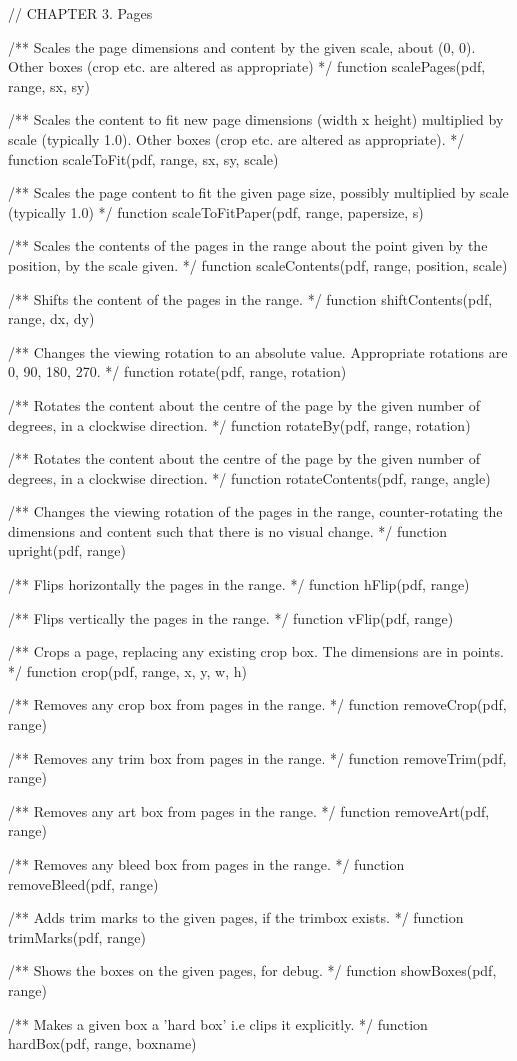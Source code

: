 // CHAPTER 3. Pages

/** Scales the page dimensions and content by the given scale, about (0, 0).
Other boxes (crop etc. are altered as appropriate) */
function scalePages(pdf, range, sx, sy)

/** Scales the content to fit new page dimensions (width x height) multiplied
by scale (typically 1.0). Other boxes (crop etc. are altered as appropriate). */
function scaleToFit(pdf, range, sx, sy, scale)

/** Scales the page content to fit the given page size, possibly multiplied by
scale (typically 1.0) */
function scaleToFitPaper(pdf, range, papersize, s)

/** Scales the contents of the pages in the range about the point given by
the position, by the scale given. */
function scaleContents(pdf, range, position, scale)

/** Shifts the content of the pages in the range. */
function shiftContents(pdf, range, dx, dy)

/** Changes the viewing rotation to an absolute value. Appropriate rotations
are 0, 90, 180, 270. */
function rotate(pdf, range, rotation)

/** Rotates the content about the centre of the page by the given number of
degrees, in a clockwise direction. */
function rotateBy(pdf, range, rotation)

/** Rotates the content about the centre of the page by the given number of
degrees, in a clockwise direction. */
function rotateContents(pdf, range, angle)

/** Changes the viewing rotation of the pages in the range, counter-rotating
the dimensions and content such that there is no visual change. */
function upright(pdf, range)

/** Flips horizontally the pages in the range. */
function hFlip(pdf, range)

/** Flips vertically the pages in the range. */
function vFlip(pdf, range)

/** Crops a page, replacing any existing crop box. The dimensions are in
points. */
function crop(pdf, range, x, y, w, h)

/** Removes any crop box from pages in the range. */
function removeCrop(pdf, range)

/** Removes any trim box from pages in the range. */
function removeTrim(pdf, range)

/** Removes any art box from pages in the range. */
function removeArt(pdf, range)

/** Removes any bleed box from pages in the range. */
function removeBleed(pdf, range)

/** Adds trim marks to the given pages, if the trimbox exists. */
function trimMarks(pdf, range)

/** Shows the boxes on the given pages, for debug. */
function showBoxes(pdf, range)

/** Makes a given box a 'hard box' i.e clips it explicitly. */
function hardBox(pdf, range, boxname)
